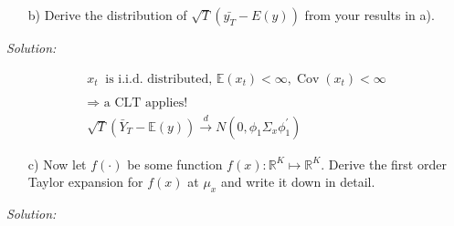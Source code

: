 \documentclass[12pt,a4paper]{article}
\newcommand{\Cov}{\operatorname{Cov}}
\begin{document}
\begin{itemize}
  \item[b)] Derive the distribution of $\sqrt{T} \left(\bar{y_T} - E(y) \right)$ from your results in a). 
\end{itemize}

\emph{Solution:}

\begin{align*}
  x_t \  \text{ is i.i.d. distributed, } \mathbb{E}(x_t)< \infty, \Cov(x_t) < \infty \\
  \\
  \Rightarrow \text{ a CLT applies!}\\
  \sqrt{T} \left( \bar{Y}_T - \mathbb{E} (y) \right) \overset{d}{\longrightarrow} N(0, \phi_1 \Sigma_x \phi_1^{'} )
\end{align*}

\begin{itemize}
  \item[c)] Now let $f(\cdot)$ be some function $f(x): \mathbb{R}^K \mapsto \mathbb{R}^K$. Derive the first order Taylor expansion for $f(x)$ at $\mu_x$ and write it down in detail.  
\end{itemize}

\emph{Solution:}
\end{document}
